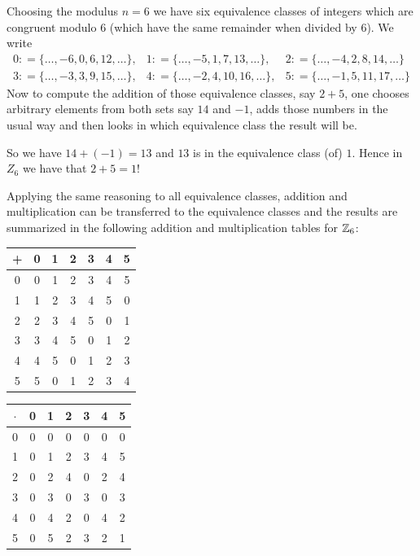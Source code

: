 \begin{example} 
\label{z_6}
Choosing the modulus $ n = 6 $ we have six equivalence classes of integers which are congruent modulo $ 6 $ (which have the same remainder when divided by $6$). We write
$$
\begin{array}{lll}
0: = \{\ldots, -6,0,6,12, \ldots \}, &
1: = \{\ldots, -5,1,7,13, \ldots \}, &
2: = \{\ldots, -4,2,8,14, \ldots \} \\
3: = \{\ldots, -3,3,9,15, \ldots \}, &
4: = \{\ldots, -2,4,10,16, \ldots \}, &
5: = \{\ldots, -1,5,11,17, \ldots \}
\end{array}
$$
Now to compute the addition of those equivalence classes, say $2+5$, one chooses arbitrary elements from both sets say $14$ and $-1$, adds those numbers in the usual way and then looks in which equivalence class the result will be. 

So we have $14+(-1)=13$ and $13$ is in the equivalence class (of) $1$. Hence in $Z_6$ we have that $2+5=1$!

Applying the same reasoning to all equivalence classes, addition and multiplication can  be transferred to the equivalence classes and the results are summarized in the following addition and multiplication tables for $ \mathbb{Z}_6 $:
\begin{center}
  \begin{tabular}{c | c c c c c c}
    + & 0 & 1 & 2 & 3 & 4 & 5\\\hline
    0 & 0 & 1 & 2 & 3 & 4 & 5 \\
    1 & 1 & 2 & 3 & 4 & 5 & 0\\
    2 & 2 & 3 & 4 & 5 & 0 & 1\\
    3 & 3 & 4 & 5 & 0 & 1 & 2\\
    4 & 4 & 5 & 0 & 1 & 2 & 3\\
    5 & 5 & 0 & 1 & 2 & 3 & 4
  \end{tabular} \quad \quad \quad \quad
  \begin{tabular}{c | c c c c c c}
$ \cdot $ & 0 & 1 & 2 & 3 & 4 & 5 \\\hline
        0 & 0 & 0 & 0 & 0 & 0 & 0\\
        1 & 0 & 1 & 2 & 3 & 4 & 5\\
        2 & 0 & 2 & 4 & 0 & 2 & 4\\
        3 & 0 & 3 & 0 & 3 & 0 & 3\\
        4 & 0 & 4 & 2 & 0 & 4 & 2\\
        5 & 0 & 5 & 2 & 3 & 2 & 1
  \end{tabular}
\end{center}


\end{example}
